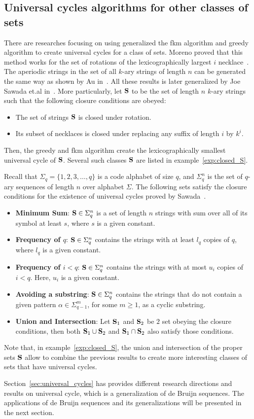 \subsection{Universal cycles algorithms for other classes of sets}
There are researches focusing on using generalized the \gls{fkm} algorithm and greedy algorithm to create universal cycles for a class of sets. Moreno proved that this method works for the set of rotations of the lexicographically largest $i$ necklace~\cite{moreno2004theorem}. The aperiodic strings in the set of all $k$-ary strings of length $n$ can be generated the same way as shown by Au in~\cite{au2015generalized}. All these results is later generalized by Joe Sawada et.al in~\cite{sawada2016generalizing}. More particularly, let ${\mathbf S}$ to be the set of length $n$ $k$-ary strings such that the following closure conditions are obeyed:
\begin{itemize}
    \item The set of strings ${\mathbf S}$ is closed under rotation.
    \item Its subset of necklaces is closed under replacing any suffix of length $i$ by $k^i$. 
\end{itemize}
Then, the greedy and \gls{fkm} algorithm create the lexicographically smallest universal cycle of ${\mathbf S}$. Several such classes ${\mathbf S}$ are listed in example~\ref{exp:closed_S}.

\begin{example}\label{exp:closed_S}
Recall that $\Sigma_{q}=\{1,2,3,\ldots,q\}$ is a code alphabet of size $q$, and $\Sigma_{q}^{n}$ is the set of $q$-ary sequences of length $n$ over alphabet $\Sigma$. The following sets satisfy the closure conditions for the existence of universal cycles proved by Sawada~\cite{sawada2016generalizing}.
\begin{itemize}
    \item \textbf{Minimum Sum}: ${\mathbf S}\in\Sigma_{q}^{n}$ is a set of length $n$ strings with sum over all of its symbol at least $s$, where $s$ is a given constant.
    \item \textbf{Frequency of $q$}: ${\mathbf S}\in\Sigma_{q}^{n}$ contains the strings with at least $l_{q}$ copies of $q$, where $l_{q}$ is a given constant.
    \item \textbf{Frequency of $i<q$}: ${\mathbf S}\in\Sigma_{q}^{n}$ contains the strings with at most $u_{i}$ copies of $i<q$. Here, $u_{i}$ is a given constant.
    \item \textbf{Avoiding a substring}: ${\mathbf S}\in\Sigma_{q}^{n}$ contains the strings that do not contain a given pattern $\alpha\in\Sigma_{q-1}^{m}$, for some $m\geq1$, as a cyclic substring. 
    \item \textbf{Union and Intersection}: Let ${\mathbf S}_{1}$ and ${\mathbf S}_{2}$ be $2$ set obeying the closure conditions, then both ${\mathbf S}_{1}\cup {\mathbf S}_{2}$ and ${\mathbf S}_{1}\cap {\mathbf S}_{2}$ also satisfy those conditions.
\end{itemize}
\end{example}
Note that, in example~\ref{exp:closed_S}, the union and intersection of the proper sets ${\mathbf S}$ allow to combine the previous results to create more interesting classes of sets that have universal cycles. 

Section~\ref{sec:universal_cycles} has provides different research directions and results on universal cycle, which is a generalization of de Bruijn sequences. The applications of de Bruijn sequences and its generalizations will be presented in the next section. 
